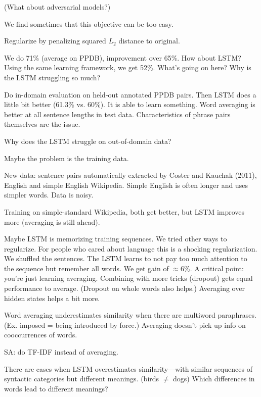 (What about adversarial models?)

We find sometimes that this objective can be too easy.

Regularize by penalizing squared $L_2$ distance to original. 

We do 71\% (average on PPDB), improvement over 65\%. How about LSTM?
Using the same learning framework, we get 52\%. What's going on here?
Why is the LSTM struggling so much? 

Do in-domain evaluation on held-out annotated PPDB pairs. Then LSTM does a little bit better (61.3\% vs. 60\%). It is able to learn something.  
Word averaging is better at all sentence lengths in test data. Characteristics of phrase pairs themselves are the issue.

Why does the LSTM struggle on out-of-domain data? 

Maybe the problem is the training data. 

New data: sentence pairs automatically extracted by Coster and Kauchak (2011), English and simple English Wikipedia.  Simple English is often longer and uses simpler words. Data is noisy. 

Training on simple-standard Wikipedia, both get better, but LSTM improves more (averaging is still ahead). 

Maybe LSTM is memorizing training sequences. 
We tried other ways to regularize. For people who cared about language this is a shocking regularization. We shuffled the sentences. The LSTM learns to not pay too much attention to the sequence but remember all words. We get gain of $\approx 6\%$. A critical point: you're just learning averaging.
Combining with more tricks (dropout) gets equal performance to average. (Dropout on whole words also helps.) Averaging over hidden states helps a bit more. 

Word averaging underestimates similarity when there are multiword paraphrases. (Ex. imposed = being introduced by force.)
Averaging doesn't pick up info on cooccurrences of words. 

SA: do TF-IDF instead of averaging.

There are cases when LSTM overestimates similarity---with similar sequences of syntactic categories but different meanings. (birds $\ne$ dogs) Which differences in words lead to different meanings?


